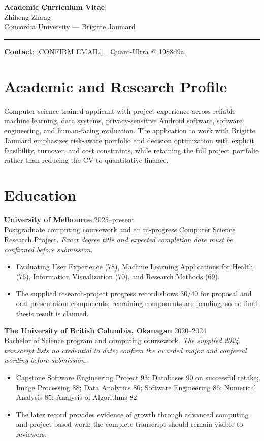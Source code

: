 \documentclass[11pt]{article}
\makeatletter
\newcommand{\ApplicantName}{Zhiheng Zhang}
\newcommand{\ApplicantEmail}{[CONFIRM EMAIL]}
\newcommand{\ApplicantPhone}{[CONFIRM PHONE]}
\newcommand{\ApplicantGitHub}{\href{https://github.com/zhiheng-zhang-Mera/Quant-Ultra/tree/1988d9a8530da91a8158de864d098ea869098923}{Quant-Ultra @ 1988d9a}}
\makeatother
\begin{document}
\begin{center}
{\LARGE\bfseries Academic Curriculum Vitae}\\[0.25em]
{\large \ApplicantName}\\
Concordia University --- Brigitte Jaumard
\end{center}
\vspace{0.35em}\hrule\vspace{0.65em}

\textbf{Contact}: \ApplicantEmail\quad | \quad \ApplicantPhone\quad | \quad \ApplicantGitHub

\section*{Academic and Research Profile}
Computer-science-trained applicant with project experience across reliable machine learning, data systems, privacy-sensitive Android software, software engineering, and human-facing evaluation. The application to work with Brigitte Jaumard emphasizes risk-aware portfolio and decision optimization with explicit feasibility, turnover, and cost constraints, while retaining the full project portfolio rather than reducing the CV to quantitative finance.

\section*{Education}
\textbf{University of Melbourne} \hfill 2025--present\\
Postgraduate computing coursework and an in-progress Computer Science Research Project. \textit{Exact degree title and expected completion date must be confirmed before submission.}
\begin{itemize}
\item Evaluating User Experience (78), Machine Learning Applications for Health (76), Information Visualization (70), and Research Methods (69).
\item The supplied research-project progress record shows 30/40 for proposal and oral-presentation components; remaining components are pending, so no final thesis result is claimed.
\end{itemize}

\textbf{The University of British Columbia, Okanagan} \hfill 2020--2024\\
Bachelor of Science program and computing coursework. \textit{The supplied 2024 transcript lists no credential to date; confirm the awarded major and conferral wording before submission.}
\begin{itemize}
\item Capstone Software Engineering Project 93; Databases 90 on successful retake; Image Processing 88; Data Analytics 86; Software Engineering 86; Numerical Analysis 85; Analysis of Algorithms 82.
\item The later record provides evidence of growth through advanced computing and project-based work; the complete transcript should remain visible to reviewers.
\end{itemize}
\end{document}
